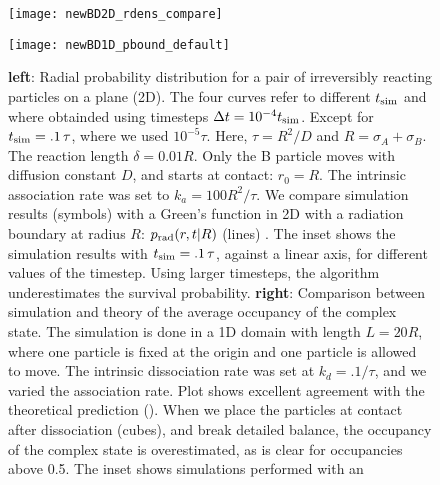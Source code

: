 \begin{figure}[ht]
\begin{minipage}[ht]{.5\linewidth}
\centering
\texttt{[image: newBD2D\_rdens\_compare]}
\end{minipage}
\begin{minipage}[ht]{.5\linewidth}
\centering
\texttt{[image: newBD1D\_pbound\_default]}
\end{minipage}
\caption{ {\bf left}: Radial probability distribution for a pair of irreversibly reacting particles on a plane (2D). The four curves refer to different $t_{\rm sim}$ and where obtainded using timesteps  $\Delta t = 10^{-4} t_{\rm sim}$. Except for $t_{\rm sim} = .1\,\tau$, where we used $10^{-5} \tau$. Here, $\tau = R^2/D$ and $R=\sigma_A+\sigma_B$. The reaction length $\delta=0.01 R$. Only the B particle moves with diffusion constant $D$, and starts at contact: $r_0=R$. The intrinsic association rate was set to $k_a = 100 R^2/\tau$. We compare simulation results (symbols) with a Green's function in 2D with a radiation boundary at radius $R$: $p_{\rm rad}(r,t|R)$ (lines) \cite{Beck1992}. The inset shows the simulation results with $t_{\rm sim} = .1\,\tau$, against a linear axis, for different values of the timestep. Using larger timesteps, the algorithm underestimates the survival probability.
{\bf right}: Comparison between simulation and theory of the average occupancy of the complex state. The simulation is done in a 1D domain with length $L=20 R$, where one particle is fixed at the origin and one particle is allowed to move. The intrinsic dissociation rate was set at $k_d=.1/\tau$, and we varied the association rate. Plot shows excellent agreement with the theoretical prediction (). When we place the particles at contact after dissociation (cubes), and break detailed balance, the occupancy of the complex state is overestimated, as is clear for occupancies above 0.5. The inset shows simulations performed with an }
\end{figure}



